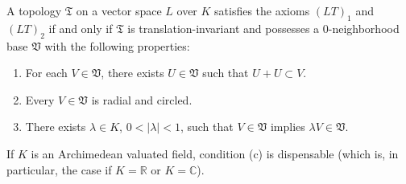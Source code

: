 A topology $\mathfrak{T}$ on a vector space $L$ over $K$ satisfies the axioms $(LT)_1$ and $(LT)_2$ if and only if $\mathfrak{T}$ is translation-invariant and possesses a $0$-neighborhood base $\mathfrak{V}$ with the following properties:

\begin{enumerate}
\item[(a)] For each $V \in \mathfrak{V}$, there exists $U \in \mathfrak{V}$ such that $U + U \subset V$.
\item[(b)] Every $V \in \mathfrak{V}$ is radial and circled.
\item[(c)] There exists $\lambda \in K$, $0 < |\lambda| < 1$, such that $V \in \mathfrak{V}$ implies $\lambda V \in \mathfrak{V}$.
\end{enumerate}

If $K$ is an Archimedean valuated field, condition (c) is dispensable (which is, in particular, the case if $K = \mathbb{R}$ or $K = \mathbb{C}$).
